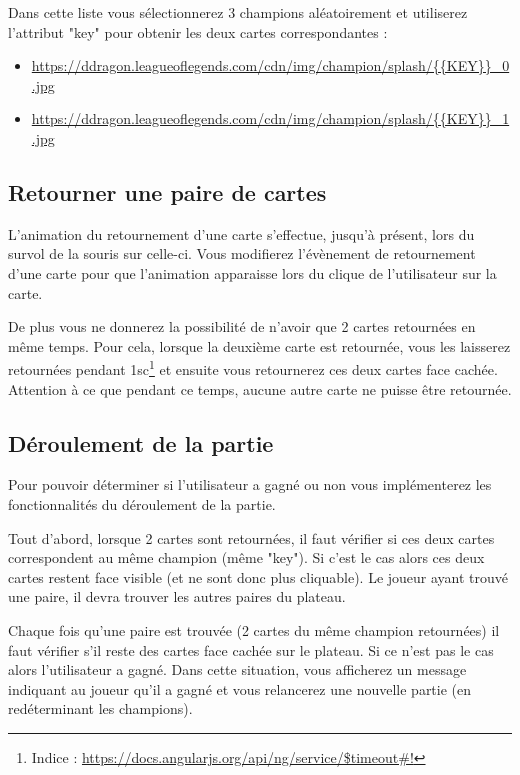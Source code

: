 \documentclass[a4paper,11pt]{article}
\theoremstyle{mytheor}
\begin{document}
\normalsize

Dans cette liste vous sélectionnerez 3 champions aléatoirement et utiliserez l'attribut "key" pour obtenir les deux cartes correspondantes :
\small
\begin{itemize}
    \item \url{https://ddragon.leagueoflegends.com/cdn/img/champion/splash/{{KEY}}_0.jpg}
    \item \url{https://ddragon.leagueoflegends.com/cdn/img/champion/splash/{{KEY}}_1.jpg}
\end{itemize}
\normalsize

\subsection{Retourner une paire de cartes}
L'animation du retournement d'une carte s'effectue, jusqu'à présent, lors du survol de la souris sur celle-ci. Vous modifierez l'évènement de retournement d'une carte pour que l'animation apparaisse lors du clique de l'utilisateur sur la carte. 

De plus vous ne donnerez la possibilité de n'avoir que 2 cartes retournées en même temps. Pour cela, lorsque la deuxième carte est retournée, vous les laisserez retournées pendant 1sc\footnote{Indice : \url{https://docs.angularjs.org/api/ng/service/\$timeout\#!}} et ensuite vous retournerez ces deux cartes face cachée. Attention à ce que pendant ce temps, aucune autre carte ne puisse être retournée. 

\subsection{Déroulement de la partie}
Pour pouvoir déterminer si l'utilisateur a gagné ou non vous implémenterez les fonctionnalités du déroulement de la partie.

Tout d'abord, lorsque 2 cartes sont retournées, il faut vérifier si ces deux cartes correspondent au même champion (même "key"). Si c'est le cas alors ces deux cartes restent face visible (et ne sont donc plus cliquable). Le joueur ayant trouvé une paire, il devra trouver les autres paires du plateau.

Chaque fois qu'une paire est trouvée (2 cartes du même champion retournées) il faut vérifier s'il reste des cartes face cachée sur le plateau. Si ce n'est pas le cas alors l'utilisateur a gagné. Dans cette situation, vous afficherez un message indiquant au joueur qu'il a gagné et vous relancerez une nouvelle partie (en redéterminant les champions). 
\end{document}
